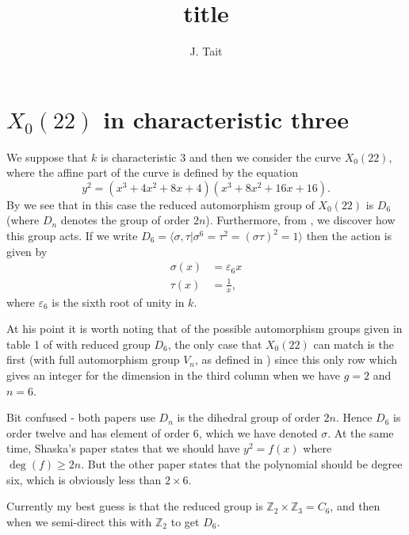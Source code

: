 \documentclass[draft, 11pt]{article} %
\title{title}
\author{J. Tait}
\theoremstyle{plain}
\theoremstyle{remark}
\begin{document}
\maketitle

\section{$X_0(22)$ in characteristic three}
We suppose that $k$ is characteristic 3 and then we consider the curve $X_0(22)$, where the affine part of the curve is defined by the equation
\[
y^2 = (x^3+ 4x^2 + 8x + 4)( x^3 + 8x^2 + 16x + 16).
\]
By \cite{automorphismshyperellipticmodular} we see that in this case the reduced automorphism group of $X_0(22)$ is $D_6$ (where $D_n$ denotes the group of order $2n$).
Furthermore, from \cite{automorphismgrouphyperelliptic}, we discover how this group acts.
If we write $D_6 = \langle \sigma, \tau | \sigma^6 = \tau^2 = (\sigma\tau)^2 = 1 \rangle$ then the action is given by
\begin{align}
\sigma(x) & = \varepsilon_6 x \\
\tau(x)  & = \frac{1}{x},
\end{align}
where $\varepsilon_6$ is the sixth root of unity in $k$.

At his point it is worth noting that of the possible automorphism groups given in table 1 of \cite{automorphismgrouphyperelliptic} with reduced group $D_6$, the only case that $X_0(22)$ can match is the first (with full automorphism group $V_n$, as defined in \cite{automorphismgrouphyperelliptic}) since this only row which gives an integer for the dimension in the third column when we have $g=2$ and $n=6$.

Bit confused - both papers use $D_n$ is the dihedral group of order $2n$.
Hence $D_6$ is order twelve and has element of order 6, which we have denoted $\sigma$.
At the same time, Shaska's paper states that we should have $y^2 = f(x)$ where $\deg(f) \geq 2n$.
But the other paper states that the polynomial should be degree six, which is obviously less than $2\times 6$.

Currently my best guess is that the reduced group is $\mathbb Z_2 \times \mathbb Z_3 = C_6$, and then when we semi-direct this with $\mathbb Z_2$ to get $D_6$.




\end{document}
